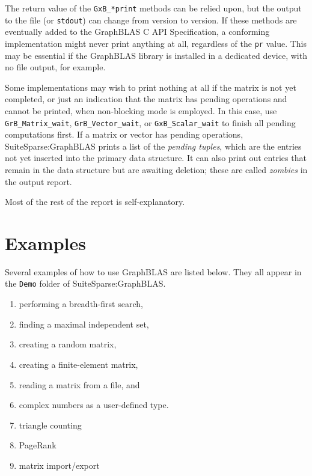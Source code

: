 \documentclass[12pt]{article}
\begin{document}
The return value of the \verb'GxB_*print' methods can be relied upon, but the
output to the file (or \verb'stdout') can change from version to version.  If
these methods are eventually added to the GraphBLAS C API Specification, a
conforming implementation might never print anything at all, regardless of the
\verb'pr' value.  This may be essential if the GraphBLAS library is installed
in a dedicated device, with no file output, for example.

Some implementations may wish to print nothing at all if the matrix is not yet
completed, or just an indication that the matrix has pending operations and
cannot be printed, when non-blocking mode is employed.  In this case, use
\verb'GrB_Matrix_wait', \verb'GrB_Vector_wait', or \verb'GxB_Scalar_wait' to
finish all pending computations first.  If a matrix or vector has pending
operations, SuiteSparse:GraphBLAS prints a list of the {\em pending tuples},
which are the entries not yet inserted into the primary data structure.  It can
also print out entries that remain in the data structure but are awaiting
deletion; these are called {\em zombies} in the output report.

Most of the rest of the report is self-explanatory.

\newpage
\section{Examples} %
\label{examples}

Several examples of how to use GraphBLAS are listed below.  They all
appear in the \verb'Demo' folder of SuiteSparse:GraphBLAS.

\begin{enumerate}
\item performing a breadth-first search,
\item finding a maximal independent set,
\item creating a random matrix,
\item creating a finite-element matrix,
\item reading a matrix from a file, and
\item complex numbers as a user-defined type.
\item triangle counting
\item PageRank
\item matrix import/export
\end{enumerate}
\end{document}
